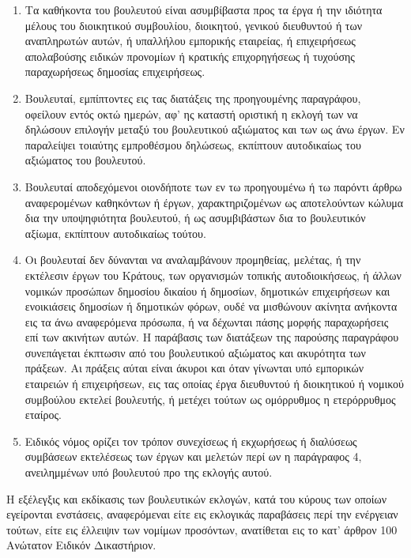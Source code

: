 \documentclass[twoside, a4paper, 10pt]{article}
\begin{document}
\begin{multicols}{2}
\begin{enumerate}
\begin{BigQuote}
\begin{enumerate}
  \item[1.] Τα καθήκοντα του βουλευτού είναι ασυμβίβαστα προς τα έργα ή την ιδιότητα μέλους του διοικητικού συμβουλίου, διοικητού, γενικού διευθυντού ή των αναπληρωτών αυτών, ή υπαλλήλου εμπορικής εταιρείας, ή επιχειρήσεως απολαβούσης ειδικών προνομίων ή κρατικής επιχορηγήσεως ή τυχούσης παραχωρήσεως δημοσίας επιχειρήσεως.
  \item[2.] Βουλευταί, εμπίπτοντες εις τας διατάξεις της προηγουμένης παραγράφου, οφείλουν εντός οκτώ ημερών, αφ' ης καταστή οριστική η εκλογή των να δηλώσουν επιλογήν μεταξύ του βουλευτικού αξιώματος και των ως άνω έργων. Εν παραλείψει τοιαύτης εμπροθέσμου δηλώσεως, εκπίπτουν αυτοδικαίως του αξιώματος του βουλευτού.
  \item[3.] Βουλευταί αποδεχόμενοι οιονδήποτε των εν τω προηγουμένω ή τω παρόντι άρθρω αναφερομένων καθηκόντων ή έργων, χαρακτηριζομένων ως αποτελούντων κώλυμα δια την υποψηφιότητα βουλευτού, ή ως ασυμβιβάστων δια το βουλευτικόν αξίωμα, εκπίπτουν αυτοδικαίως τούτου.
  \item[4.] Οι βουλευταί δεν δύνανται να αναλαμβάνουν προμηθείας, μελέτας, ή την εκτέλεσιν έργων του Κράτους, των οργανισμών τοπικής αυτοδιοικήσεως, ή άλλων νομικών προσώπων δημοσίου δικαίου ή δημοσίων, δημοτικών επιχειρήσεων και ενοικιάσεις δημοσίων ή δημοτικών φόρων, ουδέ να μισθώνουν ακίνητα ανήκοντα εις τα άνω αναφερόμενα πρόσωπα, ή να δέχωνται  πάσης μορφής παραχωρήσεις επί των ακινήτων αυτών. Η παράβασις των διατάξεων της παρούσης παραγράφου συνεπάγεται έκπτωσιν από του βουλευτικού αξιώματος και ακυρότητα των πράξεων. Αι πράξεις αύται είναι άκυροι και όταν γίνωνται υπό εμπορικών εταιρειών ή επιχειρήσεων, εις τας οποίας έργα διευθυντού ή διοικητικού ή νομικού συμβούλου εκτελεί βουλευτής, ή μετέχει τούτων ως ομόρρυθμος η ετερόρρυθμος εταίρος.
  \item[5.] Ειδικός νόμος ορίζει τον τρόπον συνεχίσεως ή εκχωρήσεως ή διαλύσεως συμβάσεων εκτελέσεως των έργων και μελετών περί ων η παράγραφος 4, ανειλημμένων υπό βουλευτού προ της εκλογής αυτού.
\end{enumerate}

Η εξέλεγξις και εκδίκασις των βουλευτικών εκλογών, κατά του κύρους των οποίων εγείρονται ενστάσεις, αναφερόμεναι είτε εις εκλογικάς παραβάσεις περί την ενέργειαν τούτων, είτε εις έλλειψιν των νομίμων προσόντων, ανατίθεται εις το κατ' άρθρον 100 Ανώτατον Ειδικόν Δικαστήριον. 


\end{BigQuote}
\end{enumerate}
\end{multicols}
\end{document}
